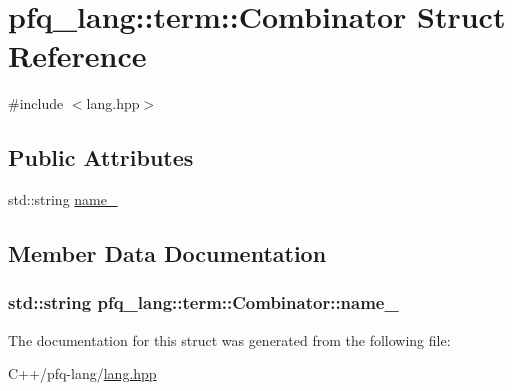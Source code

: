 \hypertarget{structpfq__lang_1_1term_1_1Combinator}{\section{pfq\+\_\+lang\+:\+:term\+:\+:Combinator Struct Reference}
\label{structpfq__lang_1_1term_1_1Combinator}
}


{\ttfamily \#include $<$lang.\+hpp$>$}

\subsection*{Public Attributes}
\begin{DoxyCompactItemize}
\item 
std\+::string \hyperlink{structpfq__lang_1_1term_1_1Combinator_a8146794f91b1cb3424dc981ac9313f45}{name\+\_\+}
\end{DoxyCompactItemize}


\subsection{Member Data Documentation}
\hypertarget{structpfq__lang_1_1term_1_1Combinator_a8146794f91b1cb3424dc981ac9313f45}{
\subsubsection[{name\+\_\+}]{\setlength{\rightskip}{0pt plus 5cm}std\+::string pfq\+\_\+lang\+::term\+::\+Combinator\+::name\+\_\+}}\label{structpfq__lang_1_1term_1_1Combinator_a8146794f91b1cb3424dc981ac9313f45}


The documentation for this struct was generated from the following file\+:\begin{DoxyCompactItemize}
\item 
C++/pfq-\/lang/\hyperlink{lang_8hpp}{lang.\+hpp}\end{DoxyCompactItemize}
